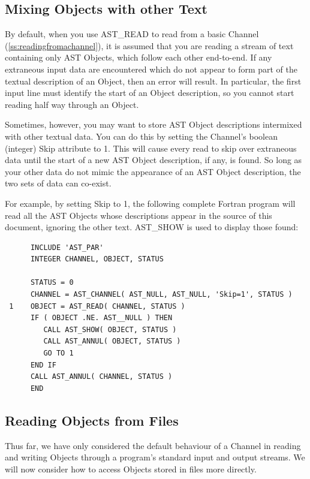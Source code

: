\documentclass[twoside,11pt]{article}
\newcommand{\htmlref}[2]{#1}
\newcommand{\secref}[1]{\S\ref{#1}}
\renewcommand{\secref}[1]{\ref{#1}}
\begin{document}
\subsection{\label{ss:mixingchanneltext}Mixing Objects with other Text}

By default, when you use \htmlref{AST\_READ}{AST_READ} to read from a basic \htmlref{Channel}{Channel}
(\secref{ss:readingfromachannel}), it is assumed that you are reading a
stream of text containing only AST Objects, which follow each other
end-to-end. If any extraneous input data are encountered which do not
appear to form part of the textual description of an \htmlref{Object}{Object}, then an
error will result. In particular, the first input line must identify
the start of an Object description, so you cannot start reading half
way through an Object.

Sometimes, however, you may want to store AST Object descriptions
intermixed with other textual data. You can do this by setting the
Channel's boolean (integer) \htmlref{Skip}{Skip} attribute to 1. This will cause every
read to skip over extraneous data until the start of a new AST Object
description, if any, is found. So long as your other data do not mimic
the appearance of an AST Object description, the two sets of data can
co-exist.

For example, by setting Skip to 1, the following complete Fortran
program will read all the AST Objects whose descriptions appear in the
source of this document, ignoring the other text. \htmlref{AST\_SHOW}{AST_SHOW} is used to
display those found:

\small
\begin{verbatim}
      INCLUDE 'AST_PAR'
      INTEGER CHANNEL, OBJECT, STATUS

      STATUS = 0      
      CHANNEL = AST_CHANNEL( AST_NULL, AST_NULL, 'Skip=1', STATUS )
 1    OBJECT = AST_READ( CHANNEL, STATUS )
      IF ( OBJECT .NE. AST__NULL ) THEN
         CALL AST_SHOW( OBJECT, STATUS )
         CALL AST_ANNUL( OBJECT, STATUS )
         GO TO 1
      END IF
      CALL AST_ANNUL( CHANNEL, STATUS )
      END
\end{verbatim}
\normalsize

\subsection{\label{ss:channelsource}Reading Objects from Files}

Thus far, we have only considered the default behaviour of a \htmlref{Channel}{Channel}
in reading and writing Objects through a program's standard input and
output streams. We will now consider how to access Objects stored in
files more directly.
\end{document}
